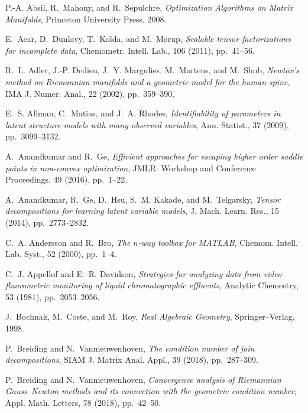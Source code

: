 \documentclass[a4paper,10pt,final]{siamart1116}
\numberwithin{equation}{section}
\numberwithin{figure}{section}
\numberwithin{table}{section}
\numberwithin{theorem}{section}
\begin{document}
\begin{thebibliography}{10}

{\sc P.-A. Absil, R.~Mahony, and R.~Sepulchre}, {\em {Optimization Algorithms
  on Matrix Manifolds}}, Princeton University Press, 2008.

{\sc E.~Acar, D.~Dunlavy, T.~Kolda, and M.~M\o{}rup}, {\em Scalable tensor
  factorizations for incomplete data}, Chemometr. Intell. Lab., 106 (2011),
  pp.~41--56.

{\sc R.~L. Adler, J.-P. Dedieu, J.~Y. Margulies, M.~Martens, and M.~Shub}, {\em
  {Newton}'s method on {Riemannian} manifolds and a geometric model for the
  human spine}, IMA J. Numer. Anal., 22 (2002), pp.~359--390.

{\sc E.~S. Allman, C.~Matias, and J.~A. Rhodes}, {\em Identifiability of
  parameters in latent structure models with many observed variables}, Ann.
  Statist., 37 (2009), pp.~3099--3132.

{\sc A.~Anandkumar and R.~Ge}, {\em Efficient approaches for escaping higher
  order saddle points in non-convex optimization}, JMLR: Workshop and
  Conference Proceedings, 49 (2016), pp.~1--22.

{\sc A.~Anandkumar, R.~Ge, D.~Hsu, S.~M. Kakade, and M.~Telgarsky}, {\em Tensor
  decompositions for learning latent variable models}, J. Mach. Learn. Res., 15
  (2014), pp.~2773--2832.

{\sc C.~A. Andersson and R.~Bro}, {\em The $n$-way toolbox for {MATLAB}},
  Chemom. Intell. Lab. Syst., 52 (2000), pp.~1--4.

{\sc C.~J. Appellof and E.~R. Davidson}, {\em Strategies for analyzing data
  from video fluorometric monitoring of liquid chromatographic effluents},
  Analytic Chemestry, 53 (1981), pp.~2053--2056.

{\sc J.~Bochnak, M.~Coste, and M.~Roy}, {\em {Real Algebraic Geometry}},
  Springer--Verlag, 1998.

{\sc P.~Breiding and N.~Vannieuwenhoven}, {\em The condition number of join
  decompositions}, SIAM J. Matrix Anal. Appl., 39 (2018), pp.~287--309.

{\sc P.~Breiding and N.~Vannieuwenhoven}, {\em Convergence analysis of
  {Riemannian Gauss--Newton} methods and its connection with the geometric
  condition number}, Appl. Math. Letters, 78 (2018), pp.~42--50.


\end{thebibliography}
\end{document}
